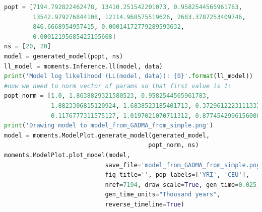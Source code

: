 \documentclass[12pt]{article}
\begin{document}
\begin{appendices}
\begin{lstlisting}[language=Python]
popt = [7194.792822462478, 13410.251542201073, 0.9582544565961783,
        13542.979276844108, 12114.968575519626, 2683.3787253409746,
        846.6668954957415, 0.00014172779289593632, 
        0.00012195685425105608]
ns = [20, 20]
model = generated_model(popt, ns)
ll_model = moments.Inference.ll(model, data)
print('Model log likelihood (LL(model, data)): {0}'.format(ll_model))
#now we need to norm vector of params so that first value is 1:
popt_norm = [1.0, 1.8638829321580523, 0.9582544565961783,
             1.8823306815120924, 1.6838523185401713, 0.3729612223111333, 
             0.1176777311575127, 1.0197021070711312, 0.8774542996156008]
print('Drawing model to model_from_GADMA_from_simple.png')
model = moments.ModelPlot.generate_model(generated_model, 
                                        popt_norm, ns)
moments.ModelPlot.plot_model(model,
                            save_file='model_from_GADMA_from_simple.png',
                            fig_title='', pop_labels=['YRI', 'CEU'],
                            nref=7194, draw_scale=True, gen_time=0.025,
                            gen_time_units="Thousand years",
                            reverse_timeline=True)
\end{lstlisting}
\end{appendices}



\end{document}

